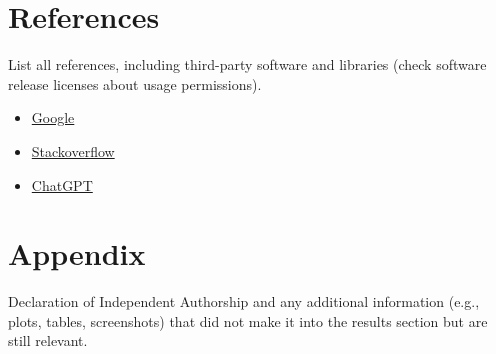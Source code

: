 \documentclass{article} %
\begin{document}
\section{References}
List all references, including third-party software and libraries (check software
release licenses about usage permissions).
\begin{itemize}
    \item \href{https://www.google.com}{Google}
    \item \href{https://stackoverflow.com}{Stackoverflow}
    \item \href{https://chatgpt.com}{ChatGPT}
\end{itemize}
\lipsum[1-1]

\section{Appendix}
Declaration of Independent Authorship and any additional
information (e.g., plots, tables, screenshots) that did not make it into the results section but
are still relevant.\\
\lipsum[1-1]
\end{document}
